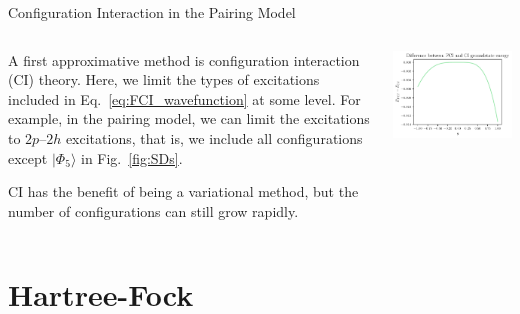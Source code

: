 \documentclass[UKenglish,aspectratio=169]{beamer}
\begin{document}
\begin{frame}{Configuration Interaction in the Pairing Model}
    \begin{columns}
        \begin{column}{.49\textwidth}
            A first approximative method is configuration interaction (CI) theory.
            Here, we limit the types of excitations included in Eq.~\eqref{eq:FCI_wavefunction} at some level.
            For example, in the pairing model, we can limit the excitations to $2p$--$2h$ excitations, that is, we include all configurations except $\vert \Phi_5 \rangle$ in Fig.~\ref{fig:SDs}.

            \medskip

            CI has the benefit of being a variational method, but the number of configurations can still grow rapidly.
        \end{column}

        \begin{column}{.49\textwidth}
            \includegraphics[width=\textwidth]{../midterm2/figures/c_groundstate_energy_diff.pdf}
        \end{column}
    \end{columns}

\end{frame}

\section{Hartree-Fock}
\end{document}
